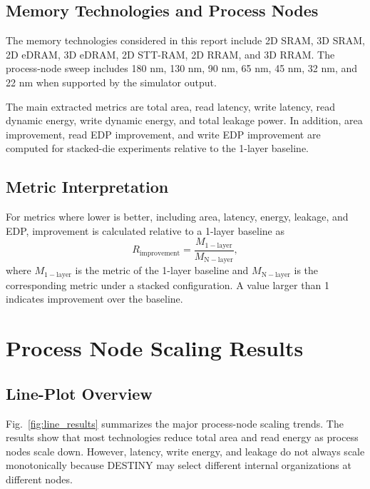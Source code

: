 \documentclass[conference]{IEEEtran}
\begin{document}
\subsection{Memory Technologies and Process Nodes}

The memory technologies considered in this report include 2D SRAM, 3D SRAM, 2D eDRAM, 3D eDRAM, 2D STT-RAM, 2D RRAM, and 3D RRAM. The process-node sweep includes 180 nm, 130 nm, 90 nm, 65 nm, 45 nm, 32 nm, and 22 nm when supported by the simulator output.

The main extracted metrics are total area, read latency, write latency, read dynamic energy, write dynamic energy, and total leakage power. In addition, area improvement, read EDP improvement, and write EDP improvement are computed for stacked-die experiments relative to the 1-layer baseline.

\subsection{Metric Interpretation}

For metrics where lower is better, including area, latency, energy, leakage, and EDP, improvement is calculated relative to a 1-layer baseline as
\begin{equation}
R_{\mathrm{improvement}} = \frac{M_{\mathrm{1-layer}}}{M_{\mathrm{N-layer}}},
\label{eq:improvement}
\end{equation}
where $M_{\mathrm{1-layer}}$ is the metric of the 1-layer baseline and $M_{\mathrm{N-layer}}$ is the corresponding metric under a stacked configuration. A value larger than 1 indicates improvement over the baseline.

\section{Process Node Scaling Results}

\subsection{Line-Plot Overview}

Fig.~\ref{fig:line_results} summarizes the major process-node scaling trends. The results show that most technologies reduce total area and read energy as process nodes scale down. However, latency, write energy, and leakage do not always scale monotonically because DESTINY may select different internal organizations at different nodes.
\end{document}
